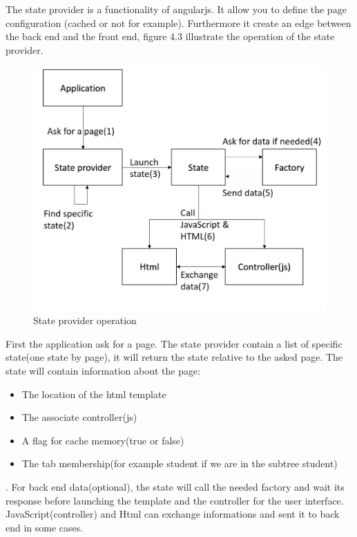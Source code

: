 \documentclass[11pt, a4paper]{report}
\begin{document}
The state provider is a functionality of angularjs. It allow you to define the page configuration (cached or not for example). Furthermore it create an edge between the back end and the front end, figure 4.3 illustrate the operation of the state provider. 
\begin{figure}[H]
\centering
\includegraphics[scale = 0.3]{Images/stateProvider_arch.png}
\caption{State provider operation}
\end{figure}
First the application ask for a page. The state provider contain a list of specific state(one state by page), it will return the state relative to the asked page. The state will contain information about the page:
\begin{itemize}
\item The location of the html template
\item The associate controller(js)
\item A flag for cache memory(true or false)
\item The tab membership(for example student if we are in the subtree student)
\end{itemize}. For back end data(optional), the state will call the needed factory and wait its response before launching the template and the controller for the user interface. JavaScript(controller) and Html can exchange informations and sent it to back end in some cases.

\end{document}
